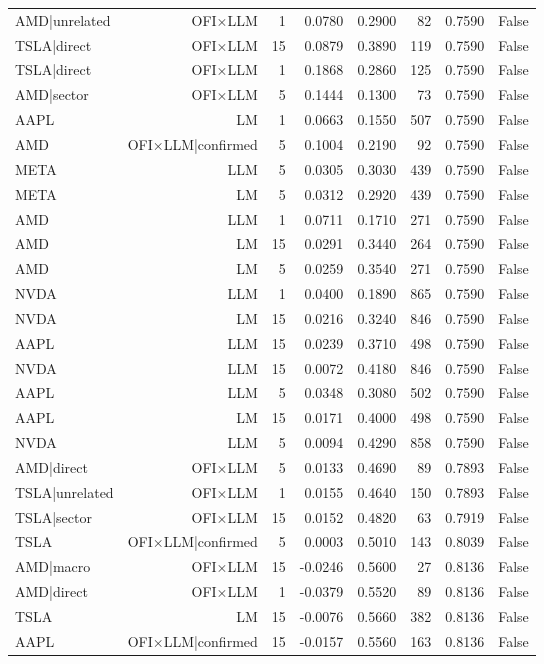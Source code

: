 \begin{table}[htbp]
\begin{tabular}{lrrrrrrr}
AMD|unrelated & OFI×LLM & 1 & 0.0780 & 0.2900 & 82 & 0.7590 & False \\
TSLA|direct & OFI×LLM & 15 & 0.0879 & 0.3890 & 119 & 0.7590 & False \\
TSLA|direct & OFI×LLM & 1 & 0.1868 & 0.2860 & 125 & 0.7590 & False \\
AMD|sector & OFI×LLM & 5 & 0.1444 & 0.1300 & 73 & 0.7590 & False \\
AAPL & LM & 1 & 0.0663 & 0.1550 & 507 & 0.7590 & False \\
AMD & OFI×LLM|confirmed & 5 & 0.1004 & 0.2190 & 92 & 0.7590 & False \\
META & LLM & 5 & 0.0305 & 0.3030 & 439 & 0.7590 & False \\
META & LM & 5 & 0.0312 & 0.2920 & 439 & 0.7590 & False \\
AMD & LLM & 1 & 0.0711 & 0.1710 & 271 & 0.7590 & False \\
AMD & LM & 15 & 0.0291 & 0.3440 & 264 & 0.7590 & False \\
AMD & LM & 5 & 0.0259 & 0.3540 & 271 & 0.7590 & False \\
NVDA & LLM & 1 & 0.0400 & 0.1890 & 865 & 0.7590 & False \\
NVDA & LM & 15 & 0.0216 & 0.3240 & 846 & 0.7590 & False \\
AAPL & LLM & 15 & 0.0239 & 0.3710 & 498 & 0.7590 & False \\
NVDA & LLM & 15 & 0.0072 & 0.4180 & 846 & 0.7590 & False \\
AAPL & LLM & 5 & 0.0348 & 0.3080 & 502 & 0.7590 & False \\
AAPL & LM & 15 & 0.0171 & 0.4000 & 498 & 0.7590 & False \\
NVDA & LLM & 5 & 0.0094 & 0.4290 & 858 & 0.7590 & False \\
AMD|direct & OFI×LLM & 5 & 0.0133 & 0.4690 & 89 & 0.7893 & False \\
TSLA|unrelated & OFI×LLM & 1 & 0.0155 & 0.4640 & 150 & 0.7893 & False \\
TSLA|sector & OFI×LLM & 15 & 0.0152 & 0.4820 & 63 & 0.7919 & False \\
TSLA & OFI×LLM|confirmed & 5 & 0.0003 & 0.5010 & 143 & 0.8039 & False \\
AMD|macro & OFI×LLM & 15 & -0.0246 & 0.5600 & 27 & 0.8136 & False \\
AMD|direct & OFI×LLM & 1 & -0.0379 & 0.5520 & 89 & 0.8136 & False \\
TSLA & LM & 15 & -0.0076 & 0.5660 & 382 & 0.8136 & False \\
AAPL & OFI×LLM|confirmed & 15 & -0.0157 & 0.5560 & 163 & 0.8136 & False \\

\end{tabular}
\end{table}
